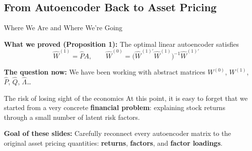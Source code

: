 \documentclass[aspectratio=169]{beamer}
\begin{document}
\subsection{From Autoencoder Back to Asset Pricing}
%
\begin{frame}{Where We Are and Where We're Going}

\textbf{What we proved (Proposition 1):} The optimal linear autoencoder satisfies
\[
\hat{W}^{(1)} = \hat{P} A, \qquad \hat{W}^{(0)} = \bigl(\hat{W}^{(1)\prime}\hat{W}^{(1)}\bigr)^{-1}\hat{W}^{(1)\prime}
\]

\vspace{0.5em}

\textbf{The question now:} We have been working with abstract matrices $W^{(0)}$, $W^{(1)}$, $\hat{P}$, $\hat{Q}$, $\hat{\Lambda}$\ldots

\vspace{0.5em}

\begin{alertblock}{The risk of losing sight of the economics}
At this point, it is easy to forget that we started from a very concrete \textbf{financial problem}: explaining stock returns through a small number of latent risk factors.
\end{alertblock}

\vspace{0.5em}

\textbf{Goal of these slides:} Carefully reconnect every autoencoder matrix to the original asset pricing quantities: \textbf{returns}, \textbf{factors}, and \textbf{factor loadings}.

\end{frame}
%
%
\end{document}
